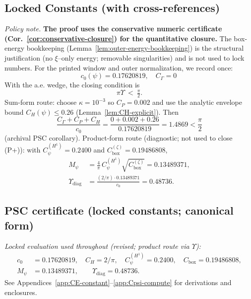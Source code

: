 \documentclass[11pt]{article}
\providecommand{\czeroplateau}{0.17620819}%
\providecommand{\CboxZeta}{K_0 + K_\xi}%
\providecommand{\CpsiHone}{0.2400}%
\providecommand{\Mpsilocked}{(4/\pi)\,\CpsiHone\,\sqrt{\CboxZeta}}
\providecommand{\UpsilonLocked}{(2/\pi)\,\Mpsilocked/\czeroplateau}%
\renewcommand{\CboxZeta}{0.19486808}
\renewcommand{\Mpsilocked}{0.13489371}
\renewcommand{\UpsilonLocked}{0.48736}
\theoremstyle{definition}
\theoremstyle{remark}
\theoremstyle{definition}
\begin{document}
\subsection*{Locked Constants (with cross-references)}
\noindent\emph{Policy note.} \textbf{The proof uses the conservative numeric certificate (Cor.~\ref{cor:conservative-closure}) for the quantitative closure.} The box-energy bookkeeping (Lemma~\ref{lem:outer-energy-bookkeeping}) is the structural justification (no $\xi$--only energy; removable singularities) and is not used to lock numbers.
\noindent For the printed window and outer normalization, we record once:
\[
 c_0(\psi)=0.17620819,\quad C_\Gamma=0\ 
\]
With the a.e. wedge, the closing condition is
\[ \pi\Upsilon\ <\ \tfrac{\pi}{2}. \]
Sum-form route: choose \(\kappa=10^{-3}\) so \(C_P=0.002\) and use the analytic envelope bound \(C_H(\psi)\le 0.26\) (Lemma~\ref{lem:CH-explicit}). Then
\[ \frac{C_\Gamma+C_P+C_H}{c_0}=\frac{0+0.002+0.26}{0.17620819}=1.4869<\frac{\pi}{2} \] (archival PSC corollary).
Product-form route (diagnostic; not used to close (P+)): with $C_\psi^{(H^1)}=0.2400$ and $C_{\mathrm{box}}^{(\zeta)}=\CboxZeta$,
\begin{align*}
M_\psi &= \tfrac{4}{\pi}\,C_\psi^{(H^1)}\sqrt{C_{\mathrm{box}}^{(\zeta)}} = \Mpsilocked,\\
\Upsilon_{\mathrm{diag}} &= \frac{(2/\pi)\cdot \Mpsilocked}{c_0} = \UpsilonLocked.
\end{align*}
\subsection*{PSC certificate (locked constants; canonical form)}
\noindent\textit{Locked evaluation used throughout (revised; product route via $\Upsilon$):}
\begin{align*}
 c_0 &= 0.17620819,\quad C_H = 2/\pi,\quad C_\psi^{(H^1)} = 0.2400,\quad C_{\mathrm{box}} = \CboxZeta,\\
 M_\psi &= \Mpsilocked,\qquad
 \Upsilon_{\mathrm{diag}} = \UpsilonLocked. 
\end{align*}
See Appendices~\ref{app:CE-constant}--\ref{app:Cpsi-compute} for derivations and enclosures.
\end{document}
